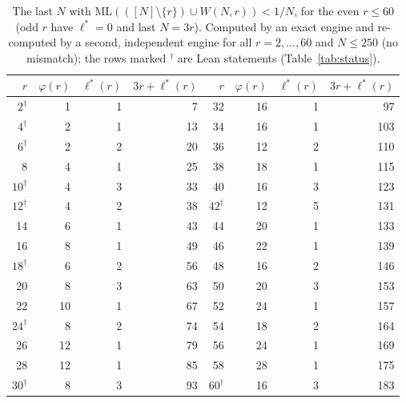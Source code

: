 \documentclass[11pt]{article}
\theoremstyle{definition}
\theoremstyle{remark}
\newcommand{\ML}{\mathrm{ML}}
\begin{document}
\begin{table}[ht]
\centering
\small
\begin{tabular}{r r r r | r r r r}
\toprule
$r$ & $\varphi(r)$ & $\ell^*(r)$ & $3r+\ell^*(r)$ & $r$ & $\varphi(r)$ & $\ell^*(r)$ & $3r+\ell^*(r)$ \\
\midrule
$2^\dagger$ & 1 & 1 & 7 & 32 & 16 & 1 & 97 \\
$4^\dagger$ & 2 & 1 & 13 & 34 & 16 & 1 & 103 \\
$6^\dagger$ & 2 & 2 & 20 & 36 & 12 & 2 & 110 \\
8 & 4 & 1 & 25 & 38 & 18 & 1 & 115 \\
$10^\dagger$ & 4 & 3 & 33 & 40 & 16 & 3 & 123 \\
$12^\dagger$ & 4 & 2 & 38 & $42^\dagger$ & 12 & 5 & 131 \\
14 & 6 & 1 & 43 & 44 & 20 & 1 & 133 \\
16 & 8 & 1 & 49 & 46 & 22 & 1 & 139 \\
$18^\dagger$ & 6 & 2 & 56 & 48 & 16 & 2 & 146 \\
20 & 8 & 3 & 63 & 50 & 20 & 3 & 153 \\
22 & 10 & 1 & 67 & 52 & 24 & 1 & 157 \\
$24^\dagger$ & 8 & 2 & 74 & 54 & 18 & 2 & 164 \\
26 & 12 & 1 & 79 & 56 & 24 & 1 & 169 \\
28 & 12 & 1 & 85 & 58 & 28 & 1 & 175 \\
$30^\dagger$ & 8 & 3 & 93 & $60^\dagger$ & 16 & 3 & 183 \\
\bottomrule
\end{tabular}
\caption{The last $N$ with $\ML(([N]\setminus\{r\})\cup W(N,r))<1/N$, for the even $r\le60$ (odd $r$ have $\ell^*=0$ and last $N=3r$). Computed by an exact engine and re-computed by a second, independent engine for all $r=2,\dots,60$ and $N\le250$ (no mismatch); the rows marked $^\dagger$ are Lean statements (Table~\ref{tab:status}).}
\label{tab:last}
\end{table}
\end{document}
